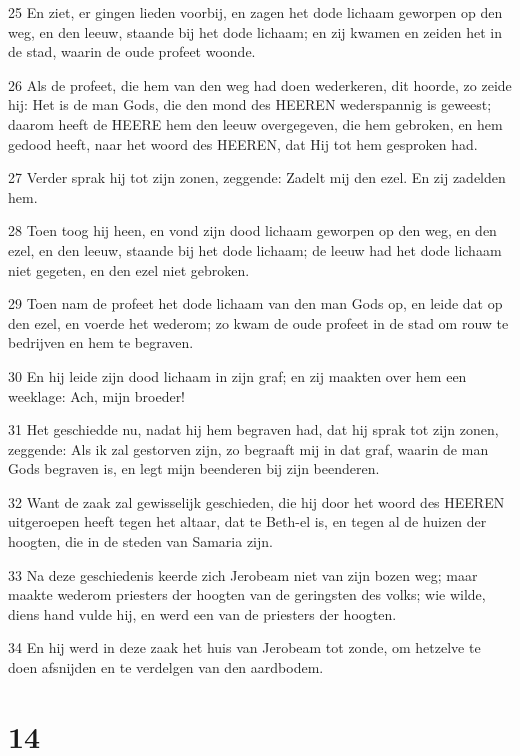 \par 25 En ziet, er gingen lieden voorbij, en zagen het dode lichaam geworpen op den weg, en den leeuw, staande bij het dode lichaam; en zij kwamen en zeiden het in de stad, waarin de oude profeet woonde.
\par 26 Als de profeet, die hem van den weg had doen wederkeren, dit hoorde, zo zeide hij: Het is de man Gods, die den mond des HEEREN wederspannig is geweest; daarom heeft de HEERE hem den leeuw overgegeven, die hem gebroken, en hem gedood heeft, naar het woord des HEEREN, dat Hij tot hem gesproken had.
\par 27 Verder sprak hij tot zijn zonen, zeggende: Zadelt mij den ezel. En zij zadelden hem.
\par 28 Toen toog hij heen, en vond zijn dood lichaam geworpen op den weg, en den ezel, en den leeuw, staande bij het dode lichaam; de leeuw had het dode lichaam niet gegeten, en den ezel niet gebroken.
\par 29 Toen nam de profeet het dode lichaam van den man Gods op, en leide dat op den ezel, en voerde het wederom; zo kwam de oude profeet in de stad om rouw te bedrijven en hem te begraven.
\par 30 En hij leide zijn dood lichaam in zijn graf; en zij maakten over hem een weeklage: Ach, mijn broeder!
\par 31 Het geschiedde nu, nadat hij hem begraven had, dat hij sprak tot zijn zonen, zeggende: Als ik zal gestorven zijn, zo begraaft mij in dat graf, waarin de man Gods begraven is, en legt mijn beenderen bij zijn beenderen.
\par 32 Want de zaak zal gewisselijk geschieden, die hij door het woord des HEEREN uitgeroepen heeft tegen het altaar, dat te Beth-el is, en tegen al de huizen der hoogten, die in de steden van Samaria zijn.
\par 33 Na deze geschiedenis keerde zich Jerobeam niet van zijn bozen weg; maar maakte wederom priesters der hoogten van de geringsten des volks; wie wilde, diens hand vulde hij, en werd een van de priesters der hoogten.
\par 34 En hij werd in deze zaak het huis van Jerobeam tot zonde, om hetzelve te doen afsnijden en te verdelgen van den aardbodem.

\chapter{14}

